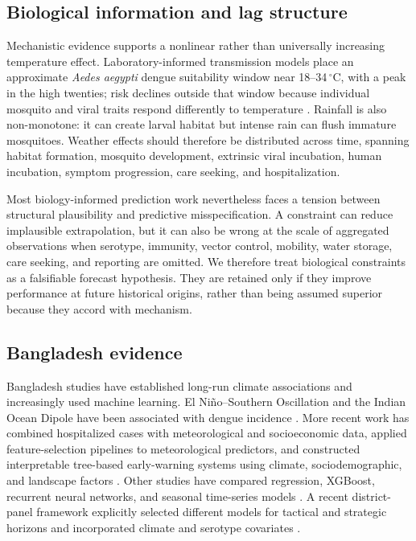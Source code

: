 \documentclass[11pt]{article}
\begin{document}
\subsection{Biological information and lag structure}

Mechanistic evidence supports a nonlinear rather than universally increasing temperature effect. Laboratory-informed transmission models place an approximate \textit{Aedes aegypti} dengue suitability window near 18--34\,$^\circ$C, with a peak in the high twenties; risk declines outside that window because individual mosquito and viral traits respond differently to temperature \citep{mordecai2017,ryan2019}. Rainfall is also non-monotone: it can create larval habitat but intense rain can flush immature mosquitoes. Weather effects should therefore be distributed across time, spanning habitat formation, mosquito development, extrinsic viral incubation, human incubation, symptom progression, care seeking, and hospitalization.

Most biology-informed prediction work nevertheless faces a tension between structural plausibility and predictive misspecification. A constraint can reduce implausible extrapolation, but it can also be wrong at the scale of aggregated observations when serotype, immunity, vector control, mobility, water storage, care seeking, and reporting are omitted. We therefore treat biological constraints as a falsifiable forecast hypothesis. They are retained only if they improve performance at future historical origins, rather than being assumed superior because they accord with mechanism.

\subsection{Bangladesh evidence}

Bangladesh studies have established long-run climate associations and increasingly used machine learning. El Ni\~no--Southern Oscillation and the Indian Ocean Dipole have been associated with dengue incidence \citep{banu2015}. More recent work has combined hospitalized cases with meteorological and socioeconomic data, applied feature-selection pipelines to meteorological predictors, and constructed interpretable tree-based early-warning systems using climate, sociodemographic, and landscape factors \citep{dey2022,mobin2024,rahman2025}. Other studies have compared regression, XGBoost, recurrent neural networks, and seasonal time-series models \citep{faruk2026}. A recent district-panel framework explicitly selected different models for tactical and strategic horizons and incorporated climate and serotype covariates \citep{fuad2026}.
\end{document}
